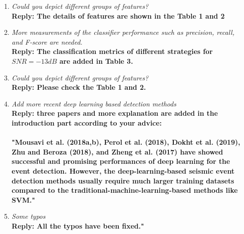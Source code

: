 \begin{enumerate}
\item \textsl{Could you depict different groups of features?}\\
\textbf{Reply: The details of features are shown in the Table 1 and 2}

\item \textsl{More measurements of the classifier performance such as precision, recall, and F-score are needed.}\\
\textbf{Reply: The classification metrics of different strategies for $SNR=-13dB$ are added in Table 3.}

\item \textsl{Could you depict different groups of features?}\\
\textbf{Reply: Please check the Table 1 and 2.}

\item \textsl{Add more recent deep learning based detection methods}\\
\textbf{Reply: three papers and more explanation are added in the introduction part according to your advice:\\ \\
"Mousavi et al. (2018a,b), Perol et al. (2018), Dokht et al. (2019), Zhu and Beroza (2018), and Zheng et al. (2017) have showed successful and promising performances of deep learning for the event detection. However, the deep-learning-based seismic event detection methods usually require much larger training datasets compared to the traditional-machine-learning-based methods like SVM."}

\item \textsl{Some typos}\\
\textbf{Reply: All the typos have been fixed."}

\end{enumerate}

